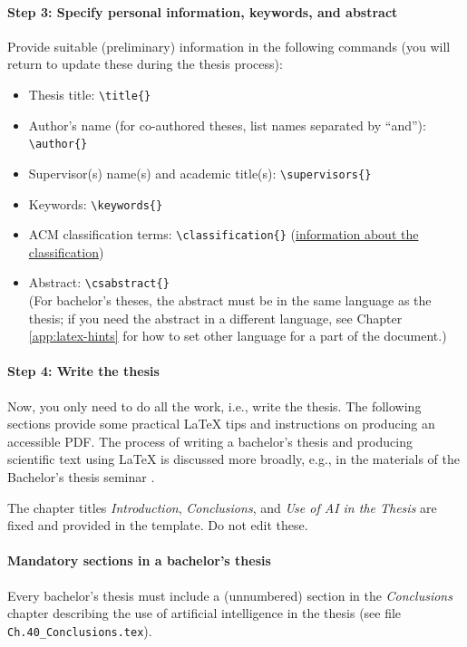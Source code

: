 \documentclass[english, manual, a4paper]{csthesis}
\begin{document}
\paragraph{Step 3: Specify personal information, keywords, and abstract}
Provide suitable (preliminary) information in the following commands 
(you will return to update these during the thesis process):
\begin{itemize}
\item Thesis title: \texttt{\textbackslash title\{\}}
\item Author’s name (for co-authored theses, list names separated by “and”): \texttt{\textbackslash author\{\}}
\item Supervisor(s) name(s) and academic title(s): \texttt{\textbackslash supervisors\{\}}
\item Keywords: \texttt{\textbackslash keywords\{\}}
\item ACM classification terms: \texttt{\textbackslash classification\{\}} (\href{https://dl.acm.org/ccs}{information about the classification})
\item Abstract: \texttt{\textbackslash csabstract\{\}} \\(For bachelor’s theses, the abstract must be in the same language as the thesis; if you need the abstract in a different language, see Chapter \ref{app:latex-hints} for how to set other language for a part of the  document.)
\end{itemize}

\paragraph{Step 4: Write the thesis}
Now, you only need to do all the work, i.e., write the thesis.  
The following sections provide some practical \LaTeX{} tips and instructions on producing an accessible PDF. The process of writing a bachelor's thesis and producing scientific text using \LaTeX{} is discussed more broadly, e.g., in the materials of the Bachelor’s thesis seminar \parencite{tieteellinenkirjoittaminen}.

The chapter titles \emph{Introduction}, \emph{Conclusions}, and \emph{Use of AI in the Thesis} are fixed and provided in the template. Do not edit these. 

\paragraph{Mandatory sections in a bachelor’s thesis}
Every bachelor's thesis must include a (unnumbered) section in the {\em Conclusions} chapter describing the use of artificial intelligence in the thesis (see file \texttt{Ch.40\_Conclusions.tex}).
\end{document}
